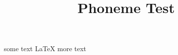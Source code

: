 \documentclass[]{article}
\title{Phoneme Test}
\begin{document}
some text \tagmcbegin{}LaTeX\tagstructend\tagmcbegin{} more text
\end{document}
